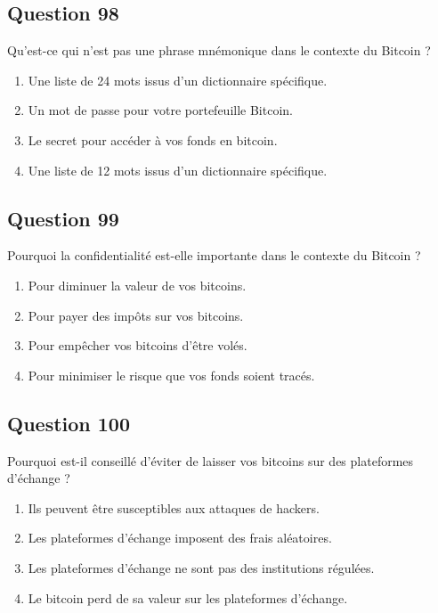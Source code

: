 \documentclass[12pt,a4paper]{article}
\begin{document}
\bigskip


\subsection*{Question 98}
Qu'est-ce qui n'est pas une phrase mnémonique dans le contexte du Bitcoin ?

\begin{enumerate}[label=\Alph*., leftmargin=*]
\item Une liste de 24 mots issus d'un dictionnaire spécifique.
\item Un mot de passe pour votre portefeuille Bitcoin.
\item Le secret pour accéder à vos fonds en bitcoin.
\item Une liste de 12 mots issus d'un dictionnaire spécifique.
\end{enumerate}

\bigskip


\subsection*{Question 99}
Pourquoi la confidentialité est-elle importante dans le contexte du Bitcoin ?

\begin{enumerate}[label=\Alph*., leftmargin=*]
\item Pour diminuer la valeur de vos bitcoins.
\item Pour payer des impôts sur vos bitcoins.
\item Pour empêcher vos bitcoins d'être volés.
\item Pour minimiser le risque que vos fonds soient tracés.
\end{enumerate}

\bigskip


\subsection*{Question 100}
Pourquoi est-il conseillé d'éviter de laisser vos bitcoins sur des plateformes d'échange ?

\begin{enumerate}[label=\Alph*., leftmargin=*]
\item Ils peuvent être susceptibles aux attaques de hackers.
\item Les plateformes d'échange imposent des frais aléatoires.
\item Les plateformes d'échange ne sont pas des institutions régulées.
\item Le bitcoin perd de sa valeur sur les plateformes d'échange.
\end{enumerate}
\end{document}
